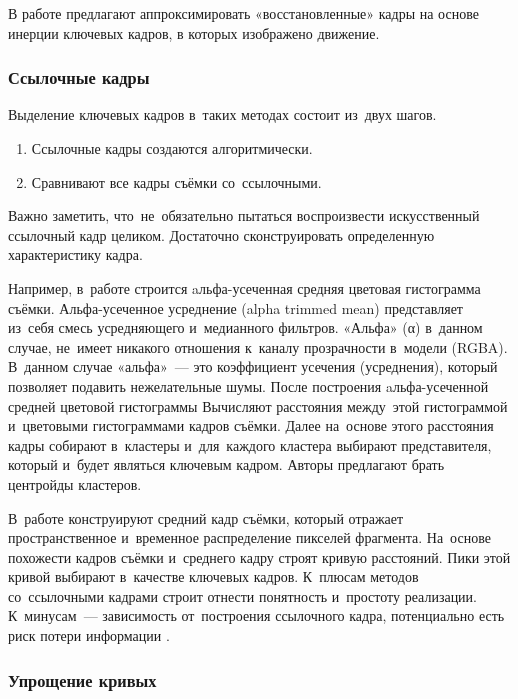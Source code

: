В работе предлагают \cite{Liu:2004} аппроксимировать «восстановленные»
кадры на основе инерции ключевых кадров, в которых изображено движение.








\subsubsection{Ссылочные кадры}

Выделение ключевых кадров в~таких методах состоит из~двух шагов.
\begin{enumerate}
    \item Ссылочные кадры создаются алгоритмически.
    \item Сравнивают все кадры съёмки со~ссылочными.
\end{enumerate}
Важно заметить, что~не~обязательно пытаться воспроизвести
искусственный ссылочный кадр целиком. Достаточно сконструировать
определенную характеристику кадра.

Например, в~работе \cite{Ferman:2003} строится
aльфа-усеченная средняя цветовая гистограмма съёмки.
Альфа-усеченное усреднение (alpha trimmed mean) представляет из~себя
смесь усредняющего и~медианного фильтров.
«Альфа» (α) в~данном случае, не~имеет никакого отношения к~каналу прозрачности
в~модели (RGBA). В~данном случае «альфа»~— это коэффициент усечения (усреднения),
который позволяет подавить нежелательные шумы.
После построения aльфа-усеченной средней цветовой гистограммы
Вычисляют расстояния между~этой гистограммой и~цветовыми
гистограммами кадров съёмки.
Далее на~основе этого расстояния кадры собирают в~кластеры
и~для~каждого кластера выбирают представителя,
который и~будет являться ключевым кадром.
Авторы предлагают брать центройды кластеров.

В~работе \cite{Sun:2008} конструируют средний кадр съёмки,
который отражает пространственное и~временное распределение
пикселей фрагмента. На~основе похожести кадров съёмки
и~среднего кадру строят кривую расстояний.
Пики этой кривой выбирают в~качестве ключевых кадров.
К~плюсам методов со~ссылочными кадрами строит
отнести понятность и~простоту реализации.
К~минусам~— зависимость от~построения ссылочного кадра,
потенциально есть риск потери информации \cite{Nabeel:2014}.


\subsubsection{Упрощение кривых}

